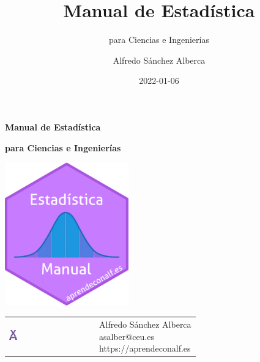 \documentclass[
  a4paper,
]{scrreport}
\title{Manual de Estadística}
\subtitle{para Ciencias e Ingenierías}
\author{Alfredo Sánchez Alberca}
\date{2022-01-06}
\theoremstyle{definition}
\theoremstyle{definition}
\theoremstyle{plain}
\theoremstyle{remark}
\begin{document}
\begin{titlepage}

\begin{center}
\vspace*{5cm}

\Huge
{\textbf{\textsf{Manual de Estadística}}}

\vspace{0.5cm}
\LARGE
{\textbf{\textsf{para Ciencias e Ingenierías}}}

\vspace{1.5cm}

\includegraphics[width=0.4\textwidth]{img/logos/sticker.png}
\end{center}

\vfill

\begin{flushleft}
\begin{tabular}{ll}
\includegraphics[width=0.1\textwidth]{img/logos/aprendeconalf.png} & \parbox[b]{5cm}{\Large\textsf{Alfredo
Sánchez
Alberca}\\ \textsf{asalber@ceu.es} \\ \textsf{https://aprendeconalf.es}}
\end{tabular}
\end{flushleft}
\end{titlepage}\ifdefined\Shaded\renewenvironment{Shaded}{\begin{tcolorbox}[sharp corners, enhanced, borderline west={3pt}{0pt}{shadecolor}, breakable, interior hidden, boxrule=0pt, frame hidden]}{\end{tcolorbox}}\fi
\end{document}
